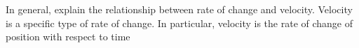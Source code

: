 {In general, explain the relationship between rate of change and velocity.}
{Velocity is a specific type of rate of change.  In particular, velocity is the rate of change of position with respect to time}
